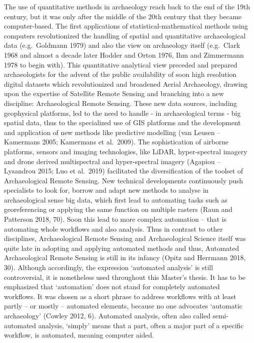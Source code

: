 \documentclass[
]{article}
\begin{document}
The use of quantitative methods in archaeology reach back to the end of the 19th century, but it was only after the middle of the 20th century that they became computer-based. The first applications of statistical-mathematical methods using computers revolutionized the handling of spatial and quantitative archaeological data (e.g.~Goldmann 1979) and also the view on archaeology itself (e.g.~Clark 1968 and almost a decade later Hodder and Orton 1976, Ihm and Zimmermann 1978 to begin with). This quantitative analytical view preceded and prepared archaeologists for the advent of the public availability of soon high resolution digital datasets which revolutionized and broadened Aerial Archaeology, drawing upon the expertise of Satellite Remote Sensing and branching into a new discipline: Archaeological Remote Sensing. These new data sources, including geophysical platforms, led to the need to handle - in archaeological terms - big spatial data, thus to the specialized use of GIS platforms and the development and application of new methods like predictive modelling (van Leusen -- Kamermans 2005; Kamermans et al.~2009). The sophistication of airborne platforms, sensors and imaging technologies, like LiDAR, hyper-spectral imagery and drone derived multispectral and hyper-spectral imagery (Agapiou -- Lysandrou 2015; Luo et al.~2019) facilitated the diversification of the toolset of Archaeological Remote Sensing.
New technical developments continuously push specialists to look for, borrow and adapt new methods to analyse in archaeological sense big data, which first lead to automating tasks such as georeferencing or applying the same function on multiple rasters (Raun and Patterson 2018, 70). Soon this lead to more complex automation -- that is automating whole workflows and also analysis.
Thus in contrast to other disciplines, Archaeological Remote Sensing and Archaeological Science itself was quite late in adopting and applying automated methods and thus, Automated Archaeological Remote Sensing is still in its infancy (Opitz and Herrmann 2018, 30). Although accordingly, the expression `automated analysis' is still controversial, it is nonetheless used throughout this Master's thesis. It has to be emphasized that `automation' does not stand for completely automated workflows. It was chosen as a short phrase to address workflows with at least partly -- or mostly -- automated elements, because no one advocates `automatic archaeology' (Cowley 2012, 6). Automated analysis, often also called semi-automated analysis, `simply' means that a part, often a major part of a specific workflow, is automated, meaning computer aided.
\end{document}
